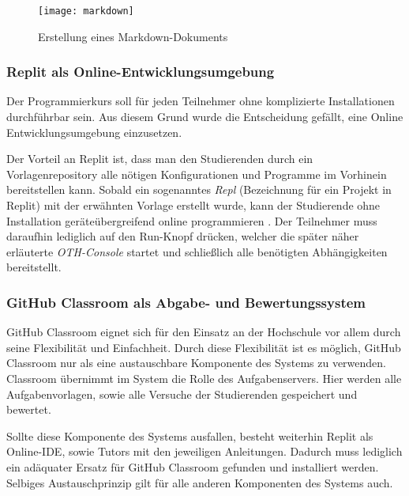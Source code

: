 \begin{figure}[H]
    \centering
    \texttt{[image: markdown]}
    \caption{Erstellung eines Markdown-Dokuments}
    \label{fig:markdown}
\end{figure}

\subsubsection{Replit als Online-Entwicklungsumgebung}
Der Programmierkurs soll für jeden Teilnehmer ohne komplizierte Installationen
durchführbar sein. Aus diesem Grund wurde die Entscheidung gefällt, eine
Online Entwicklungsumgebung einzusetzen.

Der Vorteil an Replit ist, dass man den Studierenden durch ein
Vorlagenrepository alle nötigen Konfigurationen und Programme im Vorhinein
bereitstellen kann. Sobald ein sogenanntes \emph{Repl} (Bezeichnung für
ein Projekt in Replit) mit der erwähnten Vorlage erstellt wurde, kann der
Studierende ohne Installation geräteübergreifend online programmieren
\parencite{replit-import-from-github}. Der Teilnehmer muss daraufhin lediglich
auf den \glqq Run\grqq{}-Knopf drücken, welcher die später näher erläuterte
\emph{OTH-Console} startet und schließlich alle benötigten Abhängigkeiten
bereitstellt.

\subsubsection{GitHub Classroom als Abgabe- und Bewertungssystem}
GitHub Classroom eignet sich für den Einsatz an der Hochschule vor allem durch
seine Flexibilität und Einfachheit. Durch diese Flexibilität ist es möglich,
GitHub Classroom nur als eine austauschbare Komponente des Systems zu verwenden.
Classroom übernimmt im System die Rolle des Aufgabenservers. Hier werden alle
Aufgabenvorlagen, sowie alle Versuche der Studierenden gespeichert und bewertet.

Sollte diese Komponente des Systems ausfallen, besteht weiterhin Replit als
Online-IDE, sowie Tutors mit den jeweiligen Anleitungen. Dadurch muss lediglich
ein adäquater Ersatz für GitHub Classroom gefunden und installiert werden.
Selbiges Austauschprinzip gilt für alle anderen Komponenten des Systems auch.